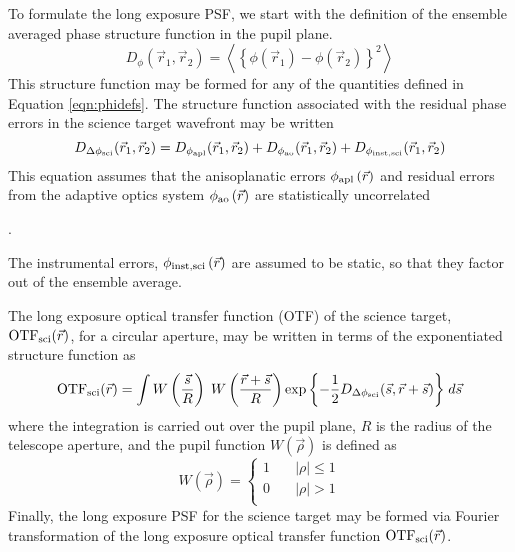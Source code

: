 To formulate the long exposure PSF, we start with the
definition of the ensemble averaged phase structure function in the
pupil plane.
\begin{equation}
\label{eqn:strfn_def}
D_{\phi}(\vec{r}_{1},\vec{r}_{2})  = 
\left\langle \left\{\phi\left(\vec{r}_{1}\right) - 
\phi\left(\vec{r}_{2}\right)\right\}^{2}\right\rangle
\end{equation}
This structure function may be formed for any of the quantities
defined in Equation \ref{eqn:phidefs}.  The structure function associated
with the residual phase errors in the science target wavefront may be written
\begin{equation}\label{eqn:lgsstrfn}
D_{\Delta\phi_{\rm sci}}(\vec{r}_{1},\vec{r}_{2}) = 
D_{\phi_{\rm apl}}(\vec{r}_{1},\vec{r}_{2}) 
+ D_{\phi_{\rm ao}}(\vec{r}_{1},\vec{r}_{2}) 
+ D_{\phi_{\rm inst,sci}}(\vec{r}_{1},\vec{r}_{2}) 
\end{equation}
This equation assumes that the anisoplanatic errors $\phi_{\rm
  apl}\left(\vec{r}\right)$ and residual errors from the
adaptive optics system $\phi_{\rm ao}\left(\vec{r}\right)$ are
statistically uncorrelated
\begin{notes}
.
\end{notes}
The instrumental errors, 
$\phi_{\rm  inst,sci}\left(\vec{r}\right)$ 
are assumed to be static, so that they factor out of the ensemble average.

The long exposure optical transfer function (OTF) of the science target,
${\rm OTF}_{\rm sci}(\vec{r})$, for a circular aperture, may be written 
in terms of the exponentiated structure function as
\begin{equation}\label{eqn:lgsotf}
{\rm OTF}_{\rm sci}(\vec{r}) = 
\int 
W\left(\frac{\vec{s}}{R}\right) \;
W\left(\frac{\vec{r} + \vec{s}}{R}\right)
\exp{ \left\{ -\frac{1}{2} 
D_{\Delta\phi_{\rm sci}}(\vec{s}, \vec{r} + \vec{s})
\right\} } 
\; d\vec{s}
\end{equation}
where the integration is carried out over the pupil plane, $R$ is the
radius of the telescope aperture, and the pupil function
$W\left(\vec{\rho}\right)$ is defined as
\begin{equation}\label{pupileqn}
W\left(\vec{\rho}\right) = 
\left\{
\begin{aligned}
1 & \quad \left\vert \rho \right\vert \le 1 \\
0 & \quad \left\vert \rho \right\vert > 1 \\
\end{aligned}
\right.
\end{equation}
Finally, the long exposure PSF for the science target may be
formed via Fourier transformation of the long exposure optical
transfer function ${\rm OTF}_{\rm sci}(\vec{r})$.

